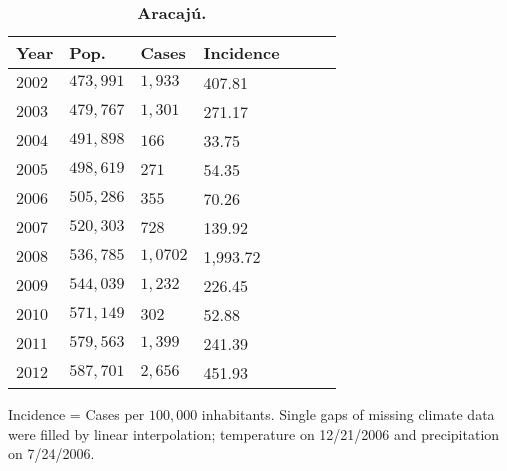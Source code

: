 \documentclass[final,leqno]{siamltexmm2}
\begin{document}
\begin{table}[!ht]
\centering
\caption{
{\bf Aracaj\'u.}}
\begin{tabular}{|l|l|l|l|l|l|l|}
\hline
\multicolumn{1}{|l|}{\bf Year} & \multicolumn{1}{|l|}{\bf Pop.} & \multicolumn{1}{|l|}{\bf Cases}& \multicolumn{1}{|l|}{\bf Incidence}\\ \hline %
$2002$ & $473,991$ & $1,933$  & \cellcolor{red!25}407.81   \\ \hline
$2003$ & $479,767$ & $1,301$  &  \cellcolor{red!25}271.17 \\ \hline
$2004$ & $491,898$ & $ 166$   &  \cellcolor{blue!25} 33.75 \\ \hline
$2005$ & $498,619$ & $ 271$   &  \cellcolor{blue!25} 54.35  \\ \hline
$2006$ & $505,286$ & $ 355$   &  \cellcolor{blue!25}70.26\\ \hline
$2007$ & $520,303$ & $728$    & \cellcolor{red!25}139.92\\ \hline
$2008$ & $536,785$ & $1,0702$ & \cellcolor{red!25}1,993.72\\ \hline
$2009$ & $544,039$ & $1,232$  & \cellcolor{red!25}226.45\\ \hline
$2010$ & $571,149$ & $302$    & \cellcolor{blue!25}52.88\\ \hline
$2011$ & $579,563$ & $1,399$  & \cellcolor{red!25}241.39\\ \hline
$2012$ & $587,701$ & $2,656$  & \cellcolor{red!25}451.93\\ \hline
\end{tabular}
\begin{flushleft} 
\vspace{.5cm}
Incidence = Cases per $100,000$ inhabitants. Single gaps of missing climate data were filled by linear interpolation; temperature on 12/21/2006 and 
precipitation on 7/24/2006.  
\end{flushleft}
\label{table3}
\end{table}
\end{document}
